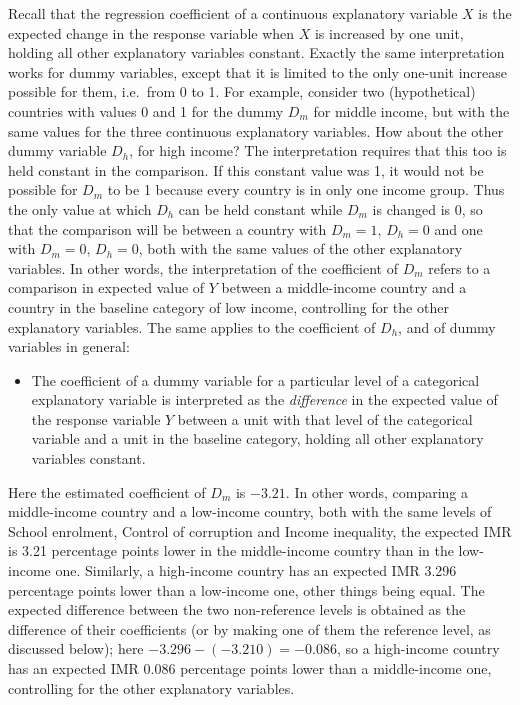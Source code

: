 Recall that the regression coefficient of a continuous explanatory
variable $X$ is the expected change in the response
variable when $X$ is increased by one unit, holding all other
explanatory variables constant. Exactly the same interpretation works
for dummy variables, except that it is limited to the only
one-unit increase possible for them, i.e.\ from 0 to 1. For
example, consider two (hypothetical) countries with values 0 and 1 for
the dummy $D_{m}$ for middle income, but with the same
values for the three continuous explanatory variables. How about the other dummy variable $D_{h}$, for high
income? The interpretation requires that this too is held constant in
the comparison. If this constant value was 1, it would not be possible
for $D_{m}$ to be 1 because every country is in only one income group.
Thus the only value at which $D_{h}$ can be held constant while $D_{m}$
is changed is 0, so that the comparison will be between a country with
$D_{m}=1, \, D_{h}=0$ and one with $D_{m}=0,\, D_{h}=0$, both with the
same values of the  other explanatory variables. In other words, the
interpretation of the coefficient of $D_{m}$ refers to a comparison
in expected value of $Y$
between a middle-income country and a country in the baseline category
of low income, controlling for the other explanatory variables. The same
applies to the coefficient of $D_{h}$, and of dummy variables in
general:
\begin{itemize}
\item
The coefficient of a dummy variable for a particular level of a
categorical explanatory variable is interpreted as the \emph{difference}
in the expected value of the response variable $Y$ between a unit with
that level of the categorical variable and a unit in the baseline
category, holding all other explanatory variables constant.
\end{itemize}
Here the estimated coefficient of $D_{m}$ is $-3.21$. In other words,
comparing a middle-income country and a low-income country, both with
the same levels of School enrolment, Control of corruption and Income
inequality, the expected IMR is 3.21 percentage points
lower in the middle-income country than in the low-income one.
Similarly, a high-income country has an expected IMR 3.296 percentage
points lower than a low-income one, other things being equal. The
expected difference between the two non-reference levels is obtained as
the difference of their coefficients (or by making one of them the
reference level, as discussed below); here $-3.296-(-3.210)=-0.086$, so
a high-income country has an expected IMR 0.086 percentage points lower
than a middle-income one, controlling for the other explanatory
variables.

